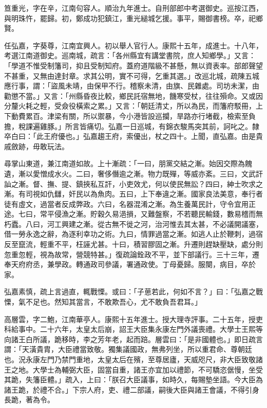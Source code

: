 \begin{pinyinscope}
笪重光，字在辛，江南句容人。順治九年進士。自刑部郎中考選御史。巡按江西，與明珠忤，罷歸。初，鄭成功犯鎮江，重光縋城乞援。事平，賜御書榜。卒，祀鄉賢。

任弘嘉，字葵尊，江南宜興人。初以舉人官行人。康熙十五年，成進士。十八年，考選江南道御史。巡南城，疏言：「各州縣宜有講堂書院，庶人知鄉學。」又言：「學道不惟受制籓司，抑且受制知府。蓋府道階級不甚懸，無以資表率。部郎聲望不甚重，又無由達封章。求其公明，實不可得，乞重其選。」改巡北城，疏陳五城應行事，謂：「盜風未靖，由保甲不行。稽察未清，由旗、民雜處。司坊未潔，由勸懲不當。」又言：「州縣昏夜比較，鄉民託宿無地，饑寒受杖，往往殞命。又或因分釐火耗之輕，受僉役橫索之累。」又言：「朝廷清丈，所以為民，而籓府駁冊，上下動費累百。津梁有關，所以禦暴，今小港皆設巡攔，旱路亦行堵截，檢索至負擔，稅課遍雞豚。」所言皆痛切。弘嘉一日巡城，有錦衣駿馬突其前，訶叱之。隸卒白曰：「此王府優也。」弘嘉趨王府，索優出，杖之四十。上聞，直弘嘉。由是貴戚斂跡，毋敢玩法。

尋掌山東道，兼江南道如故。上十漸疏：「一曰，朋黨交結之漸。始因交際為餽遺，漸以愛憎成水火。二曰，奢侈僭逾之漸。物力既殫，等威亦紊。三曰，文武訐訕之漸。督、撫、提、鎮挾私互訐，小吏效尤，何以使民無訟？四曰，紳士吹求之漸。有司視如仇讎，奸民以為魚肉。五曰，上下奉違之漸。國家良法美意，奉行者徒有虛文，過當者反成弊政。六曰，名器混淆之漸。為生養萬民計，守令宜用正途。七曰，常平侵漁之漸。貯穀久易浥損，又難盤察，不若聽民輸錢，數易稽而無朽蠹。八曰，河工興建之漸。從古無不徙之河，治河惟去其太甚，不必議開議塞，借一勞永逸之辭，為逐利幸功之術。九曰，情罪過當之漸。如逃人止於鞭刺，過宿反至竄流，輕重不平，枉誣尤甚。十曰，積習膠固之漸。升遷則趕缺壓缺，處分則忽重忽輕，視為故常，營競特甚。」復疏論銓政不平，並下部議行。三十三年，遷奉天府府丞，兼學政。轉通政司參議，署通政使。丁母憂歸。服闋，病目，卒於家。

弘嘉素慎，疏上言過直，輒戰慄。或曰：「子葸若此，何如不言？」曰：「弘嘉之戰慄，氣不足也。然知其當言，不敢欺吾心，尤不敢負吾君耳。」

高層雲，字二鮑，江南華亭人。康熙十五年進士。授大理寺評事。二十五年，授吏科給事中。二十六年，太皇太后崩，詔王大臣集永康左門外議喪禮。大學士王熙等向諸王白所議，跪移時，李之芳年老，起而踣。層雲曰：「是非國體也。」即日疏言謂：「天潢貴胄，大臣禮當致敬。獨集議國政，無弗列坐，所以重君命、尊朝廷也。況永康左門乃禁門重地，太皇太后在殯，至尊居廬，天威咫尺，非大臣致敬諸王之地。大學士為輔弼大臣，固當自重，諸王亦宜加以禮節，不可驕恣倨慢，坐受其跪，失籓臣體。」疏入，上曰：「朕召大臣議事，如時久，每賜墊坐語。今大臣為諸王跪，於禮不合。」下宗人府，吏、禮二部議，嗣後大臣與諸王會議，不得引身長跪，著為令。


\end{pinyinscope}
